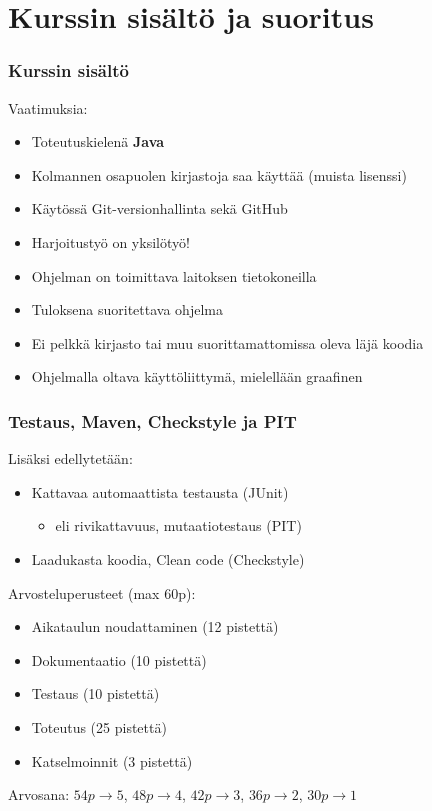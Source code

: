 \documentclass[finnish]{beamer}
\begin{document}
	\section{Kurssin sisältö ja suoritus}
	
	\begin{frame}
		\frametitle{Kurssin sisältö}

		Vaatimuksia:
		\begin{itemize}
			\item Toteutuskielenä \textbf{Java}
			\item Kolmannen osapuolen kirjastoja saa käyttää (muista lisenssi)
			\item Käytössä Git-versionhallinta sekä GitHub
			\item Harjoitustyö on yksilötyö!
			\item Ohjelman on toimittava laitoksen tietokoneilla
			\item Tuloksena suoritettava ohjelma
			\item Ei pelkkä kirjasto tai muu suorittamattomissa oleva läjä koodia
			\item Ohjelmalla oltava käyttöliittymä, mielellään graafinen
		\end{itemize}
	\end{frame}

	\begin{frame}
		\frametitle{Testaus, Maven, Checkstyle ja PIT}
		
		Lisäksi edellytetään:
		\begin{itemize}
			\item Kattavaa automaattista testausta (JUnit)
			\begin{itemize}
				\item eli rivikattavuus, mutaatiotestaus (PIT)
			\end{itemize}
			\item Laadukasta koodia, Clean code (Checkstyle)
		\end{itemize}

		Arvosteluperusteet (max 60p):
		\begin{itemize}
			\item Aikataulun noudattaminen (12 pistettä)
			\item Dokumentaatio (10 pistettä)
			\item Testaus (10 pistettä)
			\item Toteutus (25 pistettä)
			\item Katselmoinnit (3 pistettä)
		\end{itemize}
		
		Arvosana: $54p \rightarrow 5$, $48p \rightarrow 4$, $42p \rightarrow 3$, $36p \rightarrow 2$, $30p \rightarrow 1$
	\end{frame}
	
\end{document}
